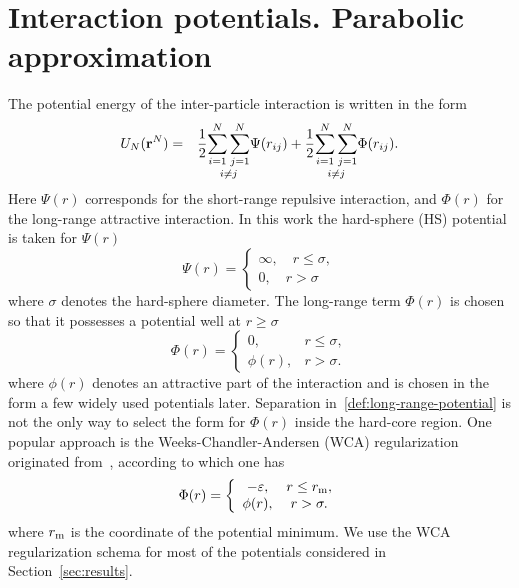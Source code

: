 \section{\label{sec:parab_pot} Interaction potentials. Parabolic approximation}
The potential energy of the inter-particle interaction is written in the form
\begin{eqnarray*}
	U_N(\vb r^N) &=& \frac12 \underset{i\neq j}{\sum_{i=1}^N \sum_{j=1}^N} \Psi(r_{ij}) 
	+ \frac12 \underset{i\neq j}{\sum_{i=1}^N \sum_{j=1}^N} \Phi(r_{ij}).	
\end{eqnarray*}
Here $\Psi(r)$ corresponds for the short-range repulsive interaction, and $\Phi(r)$ for the long-range attractive interaction. In this work the hard-sphere (HS) potential is taken for $\Psi(r)$
\begin{equation*}
	\Psi(r) = 
	\left\{
	\begin{array}{cc}
		\infty, \quad r\leq \sigma, \\
		0, \quad r > \sigma
	\end{array}
	\right.
\end{equation*}
where $\sigma$ denotes the hard-sphere diameter. The long-range term $\Phi(r)$ is chosen so that it possesses a potential well at $r \geq \sigma$
\begin{equation}
	\label{def:long-range-potential}
	\Phi(r) = \left\{
	\begin{array}{cc}
		0, & r \leq \sigma, 
		\\
		\phi(r), & r > \sigma.
	\end{array}
	\right.
\end{equation}
where $\phi(r)$ denotes an attractive part of the interaction and is chosen in the form a few widely used potentials later.
Separation in~\eqref{def:long-range-potential} is not the only way to select the form for $\Phi(r)$ inside the hard-core region. One popular approach is the Weeks-Chandler-Andersen (WCA) regularization originated from~\cite{WCA1971}, according to which one has
\begin{equation}
	\label{def:long-range-potential_wca}
	\Phi(r) = \left\{
	\begin{array}{cc}
		-\varepsilon, & r \leq r_{\rm m}, 
		\\
		\phi(r), & r > \sigma.
	\end{array}
	\right.
\end{equation}
where $r_{\rm m}$ is the coordinate of the potential minimum. We use the WCA regularization schema for most of the potentials considered in Section~\ref{sec:results}.

